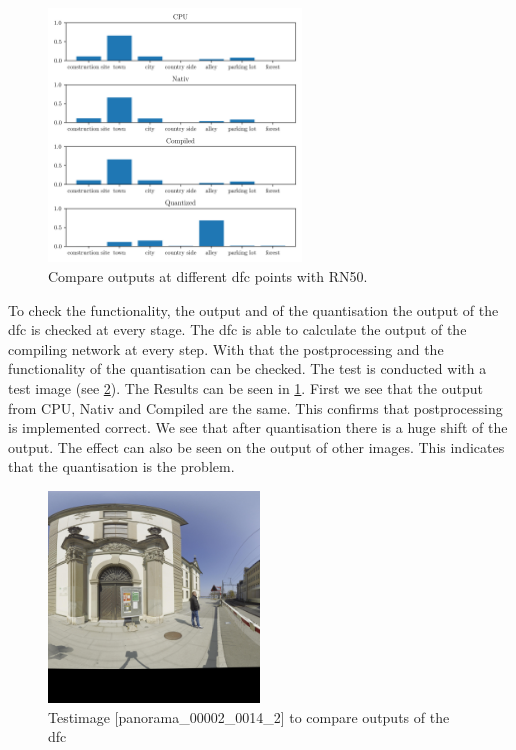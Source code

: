 \begin{figure}[h]
    \centering
    \includegraphics[width=0.6\textwidth]{Images/Implementation/compareProbs_RN50.png}
    \caption{Compare outputs at different \acrshort{dfc} points with RN50.}
    \label{methods:fig:comparern50}
\end{figure}

To check the functionality, the output and of the quantisation the output of the \acrshort{dfc} is checked at every stage.
The \acrshort{dfc} is able to calculate the output of the compiling network at every step.
With that the postprocessing and the functionality of the quantisation can be checked.
The test is conducted with a test image (see \cref{methods:fig:comparetestpic}).
The Results can be seen in \cref{methods:fig:comparern50}.
First we see that the output from CPU, Nativ and Compiled are the same.
This confirms that postprocessing is implemented correct.
We see that after quantisation there is a huge shift of the output.
The effect can also be seen on the output of other images.
This indicates that the quantisation is the problem.

\begin{figure}
    \centering
    \includegraphics[width=0.5\textwidth]{Images/Implementation/panorama_00002_0014_2_testIMg.jpg}
    \caption{Testimage [panorama\_00002\_0014\_2] to compare outputs of the \acrshort{dfc}}
    \label{methods:fig:comparetestpic}
\end{figure}

